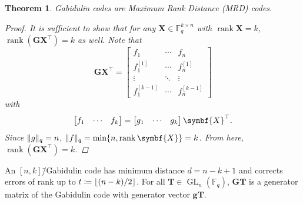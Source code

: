 \documentclass[version=last, paper=A4, parskip=half, oneside,%
toc=bibliography, toc=listof, listof=leveldown]{scrbook}
\theoremstyle{plain}
\newtheorem{theorem}{Theorem}
\theoremstyle{definition}
\theoremstyle{remark}
\renewcommand*{\vec}{\symbf}
\newcommand*{\mat}{\symbf}
\newcommand*{\trans}{\top}%
\DeclareMathOperator{\rank}{rank}
\newcommand*{\FF}{\ensuremath{\mathbb{F}}}
\DeclarePairedDelimiter{\floor}{\lfloor}{\rfloor}
\DeclarePairedDelimiter{\norm}{\lVert}{\rVert}
\newcommand*{\normR}[2]{\ensuremath{\norm{#1}_{#2}}}
\begin{document}
\begin{theorem}
  Gabidulin codes are Maximum Rank Distance (MRD) codes.
  \begin{proof}
    It is sufficient to show that for any \(\mat{X} \in \FF_{q}^{k \times n}\)
    with \(\rank \mat{X} = k\), \(\rank(\mat{G} \mat{X}^{\trans}) = k\) as well.
    Note that
    \[
      \mat{G} \mat{X}^{\trans} =
      \begin{bmatrix}
        f_1 & \cdots & f_n \\
        f_1^{[1]} & \cdots & f_n^{[1]} \\
        \vdots & \ddots & \vdots \\
        f_1^{[k - 1]} & \cdots & f_n^{[k - 1]}
      \end{bmatrix}
    \]
    with
    \[
      \begin{bmatrix}
        f_1 & \cdots & f_k
      \end{bmatrix} =
      \begin{bmatrix}
        g_1 & \cdots & g_k
      \end{bmatrix}\mat{X}^{\trans}\text.
    \]
    Since \(\normR{g}{q} = n\), \(\normR{f}{q} = \min\{n, \rank\mat{X}\} = k\).
    From here, \(\rank(\mat{G} \mat{X}^{\trans}) = k\).
\end{proof}
\end{theorem}

An \([n, k]\)\=/Gabidulin code has minimum distance \(d = n - k + 1\) and
corrects errors of rank up to \(t \coloneqq \floor{(n - k) / {2}}\).  For all
\(\mat{T} \in \operatorname{GL}_n(\FF_q)\), \(\mat{G} \mat{T}\) is a generator
matrix of the Gabidulin code with generator vector \(\vec{g} \mat{T}\).
\end{document}
